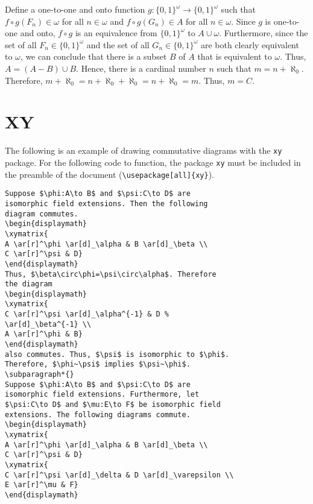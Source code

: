Define a one-to-one and onto function $g:\lbrace 0,1\rbrace^\omega \to
\lbrace 0,1\rbrace^\omega$ such that $f\circ g(F_n)\in \omega$ for all
$n\in \omega$ and $f\circ g(G_n)\in A$ for all $n\in \omega$.  Since
$g$ is one-to-one and onto, $f\circ g$ is an equivalence from $\lbrace
0,1\rbrace^\omega$ to $A \cup \omega$.  Furthermore, since the set of
all $F_n\in \lbrace 0,1\rbrace^\omega$ and the set of all $G_n\in
\lbrace 0,1\rbrace^\omega$ are both clearly equivalent to $\omega$,
we can conclude that there is a subset $B$ of $A$ that is equivalent
to $\omega$.  Thus, $A=(A-B) \cup B$. Hence, there is a cardinal
number $n$ such that $m=n+\aleph_0$. Therefore,
$m+\aleph_0=n+\aleph_0+\aleph_0=n+\aleph_0=m$. Thus, $m=C$.

\section{XY}
\label{sec:xy}

The following is an example of drawing commutative diagrams with the
\texttt{xy} package.  For the following code to function, the package
\texttt{xy} must be included in the preamble of the document
(\verb|\usepackage[all]{xy}|).

\begin{verbatim}
Suppose $\phi:A\to B$ and $\psi:C\to D$ are
isomorphic field extensions. Then the following
diagram commutes.
\begin{displaymath}
\xymatrix{
A \ar[r]^\phi \ar[d]_\alpha & B \ar[d]_\beta \\
C \ar[r]^\psi & D}
\end{displaymath}
Thus, $\beta\circ\phi=\psi\circ\alpha$. Therefore
the diagram
\begin{displaymath}
\xymatrix{
C \ar[r]^\psi \ar[d]_\alpha^{-1} & D %
\ar[d]_\beta^{-1} \\
A \ar[r]^\phi & B}
\end{displaymath}
also commutes. Thus, $\psi$ is isomorphic to $\phi$.
Therefore, $\phi~\psi$ implies $\psi~\phi$.
\subparagraph*{}
Suppose $\phi:A\to B$ and $\psi:C\to D$ are
isomorphic field extensions. Furthermore, let
$\psi:C\to D$ and $\mu:E\to F$ be isomorphic field
extensions. The following diagrams commute.
\begin{displaymath}
\xymatrix{
A \ar[r]^\phi \ar[d]_\alpha & B \ar[d]_\beta \\
C \ar[r]^\psi & D}
\xymatrix{
C \ar[r]^\psi \ar[d]_\delta & D \ar[d]_\varepsilon \\
E \ar[r]^\mu & F}
\end{displaymath}
\end{verbatim}


